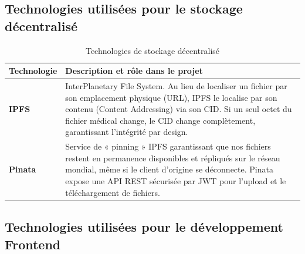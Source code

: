 \documentclass[12pt,a4paper]{report}
\begin{document}
\subsection{Technologies utilisées pour le stockage décentralisé}

\begin{table}[H]
    \centering
    \caption{Technologies de stockage décentralisé}
    \label{tab:tech_storage}
    \begin{tabular}{|p{3.5cm}|p{10cm}|}
        \hline
        \textbf{Technologie} & \textbf{Description et rôle dans le projet} \\
        \hline
        \textbf{IPFS} & InterPlanetary File System. Au lieu de localiser un fichier par son emplacement physique (URL), IPFS le localise par son contenu (Content Addressing) via son CID. Si un seul octet du fichier médical change, le CID change complètement, garantissant l'intégrité par design. \\
        \hline
        \textbf{Pinata} & Service de « pinning » IPFS garantissant que nos fichiers restent en permanence disponibles et répliqués sur le réseau mondial, même si le client d'origine se déconnecte. Pinata expose une API REST sécurisée par JWT pour l'upload et le téléchargement de fichiers. \\
        \hline
    \end{tabular}
\end{table}

\subsection{Technologies utilisées pour le développement Frontend}
\end{document}

